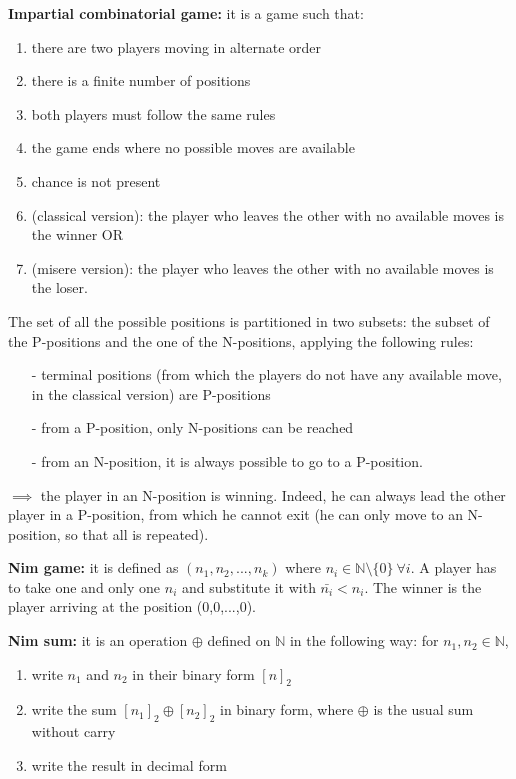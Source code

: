 \documentclass[pt11,a4paper,twoside,reqno,openright]{paper}
\begin{document}
\bigskip
\noindent \textbf{Impartial combinatorial game:} it is a game such that:
\begin{enumerate}
	\item there are two players moving in alternate order
	\item there is a finite number of positions
	\item both players must follow the same rules
	\item the game ends where no possible moves are available
	\item chance is not present
	\item (classical version): the player who leaves the other with no 
	available moves is the winner OR
	\item (misere version): the player who leaves the other with no 
	available moves is the loser.
\end{enumerate}
The set of all the possible positions is partitioned in two subsets: the 
subset of the P-positions and the one of the N-positions, applying the following 
rules:
\begin{itemize}
	\item[-] terminal positions (from which the players do not have any 
	available move, in the classical version) are P-positions
	\item[-] from a P-position, only N-positions can be reached
	\item[-] from an N-position, it is always possible to go to a P-position.
\end{itemize}
$\implies$ the player in an N-position is winning. Indeed, he can always lead 
the other player in a P-position, from which he cannot exit (he can only move 
to an N-position, so that all is repeated).

\bigskip
\noindent \textbf{Nim game:} it is defined as $(n_1,n_2,...,n_k)$ where 
$n_i \in \mathbb{N}\setminus\{0\} ~\forall i$. A player has to take one and only 
one $n_i$ and substitute it with $\bar{n_i} < n_i$. The winner is the player 
arriving at the position (0,0,...,0).

\noindent \textbf{Nim sum:} it is an operation $\oplus$ defined on $\mathbb{N}$ 
in the following way: for $n_1,n_2 \in \mathbb{N}$,
\begin{enumerate}
	\item write $n_1$ and $n_2$ in their binary form $[n]_2$
	\item write the sum $[n_1]_2 \oplus [n_2]_2$ in binary form, where $\oplus$ 
	is the usual sum without carry
	\item write the result in decimal form
\end{enumerate}
\end{document}
